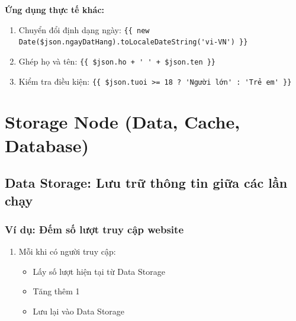 
\textbf{Ứng dụng thực tế khác:}
\begin{enumerate}
    \item Chuyển đổi định dạng ngày: \verb|{{ new Date($json.ngayDatHang).toLocaleDateString('vi-VN') }}|
    \item Ghép họ và tên: \verb|{{ $json.ho + ' ' + $json.ten }}|
    \item Kiểm tra điều kiện: \verb|{{ $json.tuoi >= 18 ? 'Người lớn' : 'Trẻ em' }}|
\end{enumerate}

\section{Storage Node (Data, Cache, Database)}

\subsection{Data Storage: Lưu trữ thông tin giữa các lần chạy}

\subsubsection{Ví dụ: Đếm số lượt truy cập website}

\begin{enumerate}
    \item Mỗi khi có người truy cập:
    \begin{itemize}
        \item Lấy số lượt hiện tại từ Data Storage
        \item Tăng thêm 1
        \item Lưu lại vào Data Storage
    \end{itemize}
\end{enumerate}


